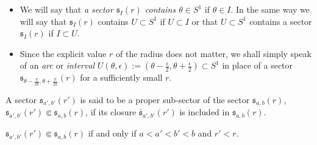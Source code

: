 \begin{rem}
  \begin{itemize}
    \item We will say that \emph{a sector $\mathfrak{s}_{I}(r)$ contains
      $\theta\in S^1$} if $\theta\in I$. In the same way we will say that
      $\mathfrak{s}_I(r)$ contains $U\subset S^1$ if $U\subset I$ or that
      $U\subset S^1$ contains a sector $\mathfrak{s}_I(r)$ if $I\subset U$.
    \item Since the explicit value $r$ of the radius does not matter, we shall
      simply speak of an \emph{arc} or \emph{interval}
      $U(\theta,\epsilon):=\left(\theta-\frac{\epsilon}{2}
      ,\theta+\frac{\epsilon}{2}\right)\subset S^1$ in place of a sector
      $\mathfrak{s}_{\theta-\frac{\pi}{2k},\theta+\frac{\pi}{2k}}(r)$ for a
      sufficiently small $r$. 
  \end{itemize}
\end{rem}
\begin{defn}
  A sector $\mathfrak{s}_{a',b'}(r')$ is said to be a proper sub-sector of the
  sector $\mathfrak{s}_{a,b}(r)$,
  $\mathfrak{s}_{a',b'}(r')\Subset\mathfrak{s}_{a,b}(r)$, if its closure
  $\bar{\mathfrak{s}}_{a',b'}(r')$ is included in $\mathfrak{s}_{a,b}(r)$.
  \begin{s-rem}
    $\mathfrak{s}_{a',b'}(r')\Subset\mathfrak{s}_{a,b}(r)$ if and only if
    $a<a'<b'<b$ and $r'<r$.
  \end{s-rem}
\end{defn}

